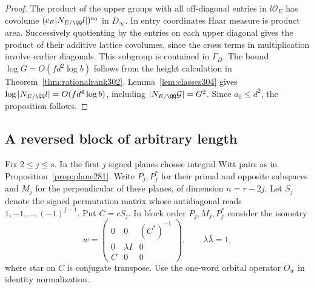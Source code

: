 \documentclass[a4paper,11pt]{article}
\theoremstyle{definition}
\theoremstyle{remark}
\numberwithin{equation}{section}
\newcommand{\OO}{\mathcal O}
\begin{document}
\begin{proof}
The product of the upper groups with all off-diagonal
entries in \(l\OO_E\) has covolume
\((c_E|N_{E/\QQ}l|)^{a_0}\) in \(D_\infty\). In entry
coordinates Haar measure is product area. Successively
quotienting by the entries on each upper diagonal gives
the product of their additive lattice covolumes, since
the cross terms in multiplication involve earlier
diagonals. This subgroup is contained in \(\Gamma_D\).
The bound \(\log G=O(fd^2\log b)\) follows from the height
calculation in Theorem~\ref{thm:rationalrank302}.
Lemma~\ref{lem:classes304} gives
\(\log |N_{E/\QQ}l|=O(fd^4\log b)\), including
\(|N_{E/\QQ}\mathcal G|=G^2\).
Since \(a_0\le d^2\), the proposition follows.
\end{proof}

\subsection{A reversed block of arbitrary length}\label{nav:IV-52}
Fix \(2\le j\le s\). In the first \(j\) signed planes
choose integral Witt pairs as in Proposition~\ref{prop:plane281}.
Write \(P_j,P_j^*\) for their primal and opposite subspaces
and \(M_j\) for the perpendicular of these planes, of
dimension \(n=r-2j\). Let \(S_j\) denote the signed
permutation matrix whose antidiagonal reads
\(1,-1,\ldots,(-1)^{j-1}\). Put \(C=cS_j\). In block
order \(P_j,M_j,P_j^*\) consider the isometry
\[
  w=\begin{pmatrix}
     0&0&(C^*)^{-1}\\
     0&\lambda I&0\\
     C&0&0
  \end{pmatrix},\qquad \lambda\bar\lambda=1,
\]
where star on \(C\) is conjugate transpose. Use the
one-word orbital operator \(O_w\) in identity normalization.
\end{document}
